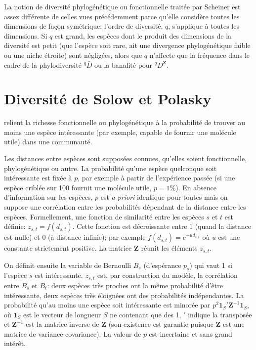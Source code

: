 \documentclass[
  11pt,
  french,
  a4paper,
  extrafontsizes,onecolumn,openright
  ]{memoir}
\begin{document}
\normalsize

La notion de diversité phylogénétique ou fonctionnelle traitée par Scheiner est assez différente de celles vues précédemment parce qu'elle considère toutes les dimensions de façon symétrique: l'ordre de diversité, \(q\), s'applique à toutes les dimensions.
Si \(q\) est grand, les espèces dont le produit des dimensions de la diversité est petit (que l'espèce soit rare, ait une divergence phylogénétique faible ou une niche étroite) sont négligées, alors que \(q\) n'affecte que la fréquence dans le cadre de la phylodiversité \(^{q}\!\bar{D}\) ou la banalité pour \(^q\!D^{\mathbf{Z}}\).

\hypertarget{diversituxe9-de-solow-et-polasky}{%
\section{Diversité de Solow et Polasky}\label{diversituxe9-de-solow-et-polasky}}

\textcite{Solow1994} relient la richesse fonctionnelle ou phylogénétique à la probabilité de trouver au moins une espèce intéressante (par exemple, capable de fournir une molécule utile) dans une communauté.

Les distances entre espèces sont supposées connues, qu'elles soient fonctionnelle, phylogénétique ou autre.
La probabilité qu'une espèce quelconque soit intéressante est fixée à \(p\), par exemple à partir de l'expérience passée (si une espèce criblée sur 100 fournit une molécule utile, \(p=1\%\)).
En absence d'information sur les espèces, \(p\) est \emph{a priori} identique pour toutes mais on suppose une corrélation entre les probabilités dépendant de la distance entre les espèces.
Formellement, une fonction de similarité entre les espèces \(s\) et \(t\) est définie: \(z_{s,t}=f(d_{s,t})\).
Cette fonction est décroissante entre 1 (quand la distance est nulle) et 0 (à distance infinie); par exemple \(f(d_{s,t}) = e^{-u d_{s,t}}\) où \(u\) est une constante strictement positive.
La matrice \(\mathbf{Z}\) réunit les éléments \(z_{s,t}\).

On définit ensuite la variable de Bernoulli \(B_s\) (d'espérance \(p_s\)) qui vaut 1 si l'espèce \(s\) est intéressante.
\(z_{s,t}\) est, par construction du modèle, la corrélation entre \(B_s\) et \(B_t\): deux espèces très proches ont la même probabilité d'être intéressante, deux espèces très éloignées ont des probabilités indépendantes.
La probabilité qu'au moins une espèce soit intéressante est minorée par \(p^2 \mathbf{1}_S' \mathbf{Z}^{-1} \mathbf{1}_S\), où \(\mathbf{1}_S\) est le vecteur de longueur \(S\) ne contenant que des 1, \('\) indique la transposée et \(\mathbf{Z}^{-1}\) est la matrice inverse de \(\mathbf{Z}\) (son existence est garantie puisque \(\mathbf{Z}\) est une matrice de variance-covariance).
La valeur de \(p\) est incertaine et sans grand intérêt.
\end{document}
